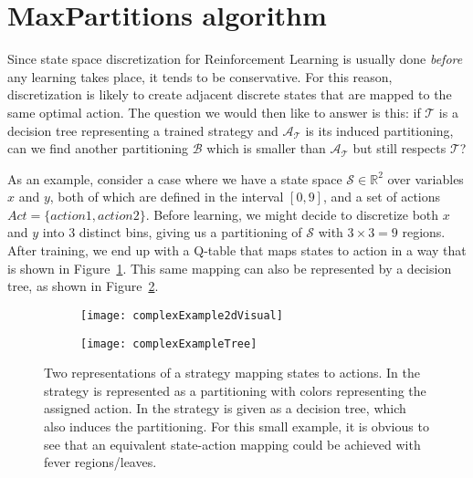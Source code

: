 \section{MaxPartitions algorithm}%
\label{sec:maxParts}

Since state space discretization for Reinforcement Learning is usually done
\textit{before} any learning takes place, it tends to be conservative. For this
reason, discretization is likely to create adjacent discrete states that are
mapped to the same optimal action. The question we would then like to answer is
this: if $\mathcal{T}$ is a decision tree representing a trained strategy and
$\mathcal{A}_{\mathcal{T}}$ is its induced partitioning, can we find another
partitioning $\mathcal{B}$ which is smaller than $\mathcal{A}_{\mathcal{T}}$ but
still respects $\mathcal{T}$?

As an example, consider a case where we have a state space $\mathcal{S} \in
\mathbb{R}^2$ over variables $x$ and $y$, both of which are defined in the
interval $[0,9]$, and a set of actions $Act = \{ action1, action2 \}$. Before
learning, we might decide to discretize both $x$ and $y$ into 3 distinct bins,
giving us a partitioning of $\mathcal{S}$ with $3\times3 = 9$ regions. After
training, we end up with a Q-table that maps states to action in a way that is
shown in Figure~\ref{fig:complexExample2dVisual}. This same mapping can also be
represented by a decision tree, as shown in Figure~\ref{fig:complexExampleTree}.

\begin{figure}[ht]
    \begin{subfigure}[b]{.5\textwidth}
        \centering
        \texttt{[image: complexExample2dVisual]}
        \subcaption{%
        }\label{fig:complexExample2dVisual}
    \end{subfigure}
    \begin{subfigure}[b]{.5\textwidth}
        \centering
        \texttt{[image: complexExampleTree]}
        \subcaption{%
        }\label{fig:complexExampleTree}
    \end{subfigure}%

    \caption{%
        Two representations of a strategy mapping states to actions. In
         the strategy is represented as a
        partitioning with colors representing the assigned action. In
         the strategy is given as a decision
        tree, which also induces the partitioning. For this small example, it is
        obvious to see that an equivalent state-action mapping could be achieved
        with fever regions/leaves.
    }%
    \label{fig:complexExample}
\end{figure}

